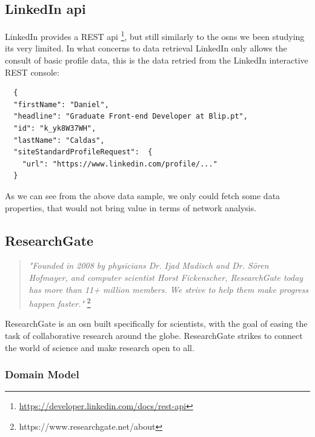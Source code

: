 \subsection*{LinkedIn \gls{api}}
LinkedIn provides a REST \gls{api} \footnote{\url{https://developer.linkedin.com/docs/rest-api}}, but still similarly to the \glspl{osn} we been studying its very limited. In what concerns to data retrieval LinkedIn only allows
the consult of basic profile data, this is the data retried from the LinkedIn interactive REST console:\\

\begin{verbatim}
  {
  "firstName": "Daniel",
  "headline": "Graduate Front-end Developer at Blip.pt",
  "id": "k_yk8W37WH",
  "lastName": "Caldas",
  "siteStandardProfileRequest":  {
    "url": "https://www.linkedin.com/profile/..."
  }
\end{verbatim}

\indent As we can see from the above data sample, we only could fetch some data properties, that would not bring value in terms of network analysis.

\subsection{ResearchGate}

\begin{quote}
\textit{"Founded in 2008 by physicians Dr. Ijad Madisch and Dr. Sören Hofmayer, and computer scientist
Horst Fickenscher, ResearchGate today has more than 11+ million members. We strive to help them make progress happen faster."} \footnote{https://www.researchgate.net/about}
\end{quote}

ResearchGate is an \gls{osn} built specifically for scientists, with the goal of easing the task of collaborative research around the globe. ResearchGate
strikes to connect the world of science and make research open to all.
\clearpage

\subsubsection*{Domain Model}

